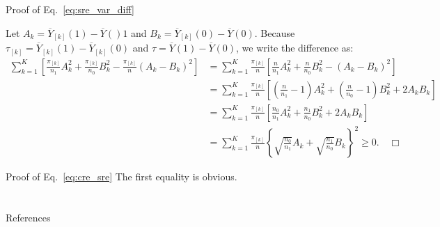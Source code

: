 \documentclass[aspectratio=169, 12pt]{beamer}
\begin{document}
\begin{frame}[label=pf-sre_var_diff]{Proof of Eq.~\eqref{eq:sre_var_diff}}

  { \footnotesize
    Let $A_k=\overline{Y}_{[k]}(1)-\overline{Y}()1$ and $B_k=\overline{Y}_{[k]}(0)-\overline{Y}(0)$. Because $\tau_{[k]}=\overline{Y}_{[k]}(1)-\overline{Y}_{[k]}(0)$ and $\tau=\overline{Y}(1)-\overline{Y}(0)$, we write the difference as:
    \begin{align*}
      \sum_{k=1}^{K}\left[\frac{\pi_{[k]}}{n_1}A_k^2+\frac{\pi_{[k]}}{n_0}B_k^2-\frac{\pi_{[k]}}{n}(A_k-B_k)^2\right]
      &= \sum_{k=1}^{K}\frac{\pi_{[k]}}{n}\left[\frac{n}{n_1}A_k^2+\frac{n}{n_0}B_k^2-(A_k-B_k)^2\right]\\
      &= \sum_{k=1}^{K}\frac{\pi_{[k]}}{n}\left[\left(\frac{n}{n_1}-1\right)A_k^2+\left(\frac{n}{n_0}-1\right)B_k^2+2A_kB_k\right]\\
      &= \sum_{k=1}^{K}\frac{\pi_{[k]}}{n}\left[\frac{n_0}{n_1}A_k^2+\frac{n_1}{n_0}B_k^2+2A_kB_k\right]\\
      &= \sum_{k=1}^{K}\frac{\pi_{[k]}}{n}\left\{\sqrt{\frac{n_0}{n_1}}A_k+\sqrt{\frac{n_1}{n_0}}B_k\right\}^2 \geq 0. \quad \Box
    \end{align*}
  }
  \vfill
  \hfill\hyperlink{sre_var_diff<1>}{}
  
\end{frame}

\begin{frame}[label=pf_cre_sre]{Proof of Eq.~\eqref{eq:cre_sre}}
  The first equality is obvious. 
  \vfill
  \hfill\hyperlink{cre_sre<1>}{}
\end{frame}



\section{}
\begin{frame}{References}
  \beamerdefaultoverlayspecification{}
  \small
  
\end{frame}
\end{document}
